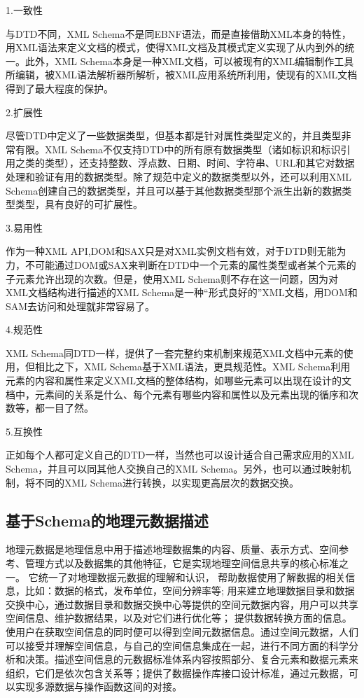 \documentclass[master]{njnuthesis}
\begin{document}
    1.一致性

    与DTD不同，XML Schema不是同EBNF语法，而是直接借助XML本身的特性，用XML语法来定义文档的模式，使得XML文档及其模式定义实现了从内到外的统一。此外，XML Schema本身是一种XML文档，可以被现有的XML编辑制作工具所编辑，被XML语法解析器所解析，被XML应用系统所利用，使现有的XML文档得到了最大程度的保护。

    2.扩展性

    尽管DTD中定义了一些数据类型，但基本都是针对属性类型定义的，并且类型非常有限。XML Schema不仅支持DTD中的所有原有数据类型（诸如标识和标识引用之类的类型），还支持整数、浮点数、日期、时间、字符串、URL和其它对数据处理和验证有用的数据类型。除了规范中定义的数据类型以外，还可以利用XML Schema创建自己的数据类型，并且可以基于其他数据类型那个派生出新的数据类型类型，具有良好的可扩展性。

    3.易用性

    作为一种XML API,DOM和SAX只是对XML实例文档有效，对于DTD则无能为力，不可能通过DOM或SAX来判断在DTD中一个元素的属性类型或者某个元素的子元素允许出现的次数。但是，使用XML Schema则不存在这一问题，因为对XML文档结构进行描述的XML Schema是一种“形式良好的”XML文档，用DOM和SAM去访问和处理就非常容易了。

    4.规范性

    XML Schema同DTD一样，提供了一套完整约束机制来规范XML文档中元素的使用，但相比之下，XML Schema基于XML语法，更具规范性。XML Schema利用元素的内容和属性来定义XML文档的整体结构，如哪些元素可以出现在设计的文档中，元素间的关系是什么、每个元素有哪些内容和属性以及元素出现的循序和次数等，都一目了然。

    5.互换性

    正如每个人都可定义自己的DTD一样，当然也可以设计适合自己需求应用的XML Schema，并且可以同其他人交换自己的XML Schema。另外，也可以通过映射机制，将不同的XML Schema进行转换，以实现更高层次的数据交换。


\subsection{基于Schema的地理元数据描述}
地理元数据是地理信息中用于描述地理数据集的内容、质量、表示方式、空间参考、管理方式以及数据集的其他特征，它是实现地理空间信息共享的核心标准之一。
它统一了对地理数据元数据的理解和认识，
帮助数据使用了解数据的相关信息，比如：数据的格式，发布单位，空间分辨率等;
用来建立地理数据目录和数据交换中心，通过数据目录和数据交换中心等提供的空间元数据内容，用户可以共享空间信息、维护数据结果，以及对它们进行优化等；
提供数据转换方面的信息。使用户在获取空间信息的同时便可以得到空间元数据信息。通过空间元数据，人们可以接受并理解空间信息，与自己的空间信息集成在一起，进行不同方面的科学分析和决策。描述空间信息的元数据标准体系内容按照部分、复合元素和数据元素来组织，它们是依次包含关系等；提供了数据操作库接口设计标准，通过元数据，可以实现多源数据与操作函数这间的对接。
\end{document}
